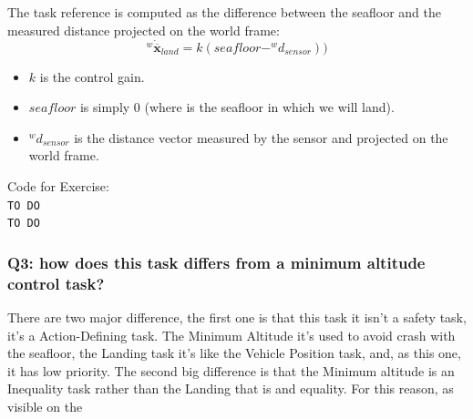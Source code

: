\documentclass{article}
\begin{document}
The task reference is computed as the difference between the seafloor and the measured distance projected on the world frame:
\begin{equation}
    ^{w}\dot{\overline{\boldsymbol{x}}}_{land} = k(seafloor - ^w d_{sensor})) %
\end{equation}
\begin{itemize}
    \item $k$ is the control gain.
    \item $seafloor$ is simply 0 (where is the seafloor in which we will land).
    \item $^w d_{sensor}$ is the distance vector measured by the sensor and projected on the world frame.
\end{itemize} 

\colorbox{mygray}{\parbox{0.9\textwidth}{Code for Exercise: \\
\texttt{TO DO}\\
\texttt{TO DO}
}}

\subsubsection{Q3: how does this task differs from a minimum altitude control task?}
There are two major difference, the first one is that this task it isn't a safety task, it's a Action-Defining task. The Minimum Altitude it's used to avoid crash with the seafloor, the Landing task it's like the Vehicle Position task, and, as this one, it has low priority.
The second big difference is that the Minimum altitude is an Inequality task rather than the Landing that is and equality. For this reason, as visible on the 
\end{document}
